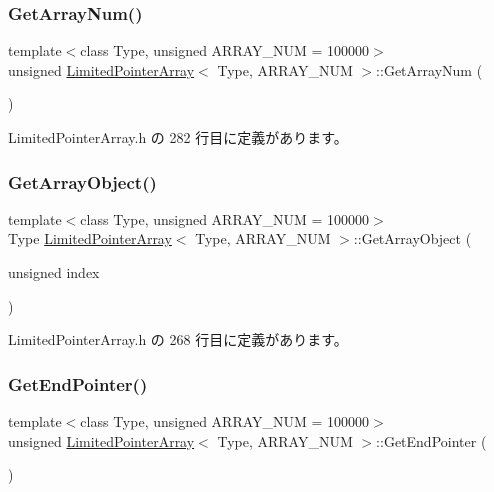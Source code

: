 \subsubsection{\texorpdfstring{Get\+Array\+Num()}{GetArrayNum()}}
{\footnotesize\ttfamily template$<$class Type, unsigned A\+R\+R\+A\+Y\+\_\+\+N\+UM = 100000$>$ \\
unsigned \mbox{\hyperlink{class_limited_pointer_array}{Limited\+Pointer\+Array}}$<$ Type, A\+R\+R\+A\+Y\+\_\+\+N\+UM $>$\+::Get\+Array\+Num (\begin{DoxyParamCaption}{ }\end{DoxyParamCaption})\hspace{0.3cm}{\ttfamily [inline]}}



 Limited\+Pointer\+Array.\+h の 282 行目に定義があります。

\mbox{\label{class_limited_pointer_array_aae48443929a3766e602eb96f515c3a34}} 
\subsubsection{\texorpdfstring{Get\+Array\+Object()}{GetArrayObject()}}
{\footnotesize\ttfamily template$<$class Type, unsigned A\+R\+R\+A\+Y\+\_\+\+N\+UM = 100000$>$ \\
Type \mbox{\hyperlink{class_limited_pointer_array}{Limited\+Pointer\+Array}}$<$ Type, A\+R\+R\+A\+Y\+\_\+\+N\+UM $>$\+::Get\+Array\+Object (\begin{DoxyParamCaption}\item[{unsigned}]{index }\end{DoxyParamCaption})\hspace{0.3cm}{\ttfamily [inline]}}



 Limited\+Pointer\+Array.\+h の 268 行目に定義があります。

\mbox{\label{class_limited_pointer_array_a4c070b87cde4d2ea173aa28918af6223}} 
\subsubsection{\texorpdfstring{Get\+End\+Pointer()}{GetEndPointer()}}
{\footnotesize\ttfamily template$<$class Type, unsigned A\+R\+R\+A\+Y\+\_\+\+N\+UM = 100000$>$ \\
unsigned \mbox{\hyperlink{class_limited_pointer_array}{Limited\+Pointer\+Array}}$<$ Type, A\+R\+R\+A\+Y\+\_\+\+N\+UM $>$\+::Get\+End\+Pointer (\begin{DoxyParamCaption}{ }\end{DoxyParamCaption})\hspace{0.3cm}{\ttfamily [inline]}}




